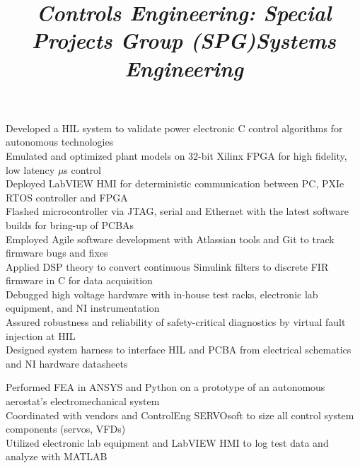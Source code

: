 \documentclass[mm]{res}
\newcommand{\tb}{\textbullet \xspace}
\begin{document}
\begin{resume}
\title{\textsl{Controls Engineering: Special Projects Group (SPG)}}
\begin{position}
\tb Developed a HIL system to validate power electronic C control algorithms for autonomous technologies\\
\tb Emulated and optimized plant models on 32-bit Xilinx FPGA for high fidelity, low latency $\mu$s control \\
\tb Deployed LabVIEW HMI for deterministic communication between PC, PXIe RTOS controller and FPGA \\
\tb Flashed microcontroller via JTAG, serial and Ethernet with the latest software builds for bring-up of PCBAs \\
\tb Employed Agile software development with Atlassian tools and Git to track firmware bugs and fixes \\
\tb Applied DSP theory to convert continuous Simulink filters to discrete FIR firmware in C for data acquisition\\
\tb Debugged high voltage hardware with in-house test racks, electronic lab equipment, and NI instrumentation \\
\tb Assured robustness and reliability of safety-critical diagnostics by virtual fault injection at HIL\\
\tb Designed system harness to interface HIL and PCBA from electrical schematics and NI hardware datasheets
\end{position}

\title{\textsl{Systems Engineering}}
\begin{position}
\tb Performed FEA in ANSYS and Python on a prototype of an autonomous aerostat's electromechanical system \\
\tb Coordinated with vendors and ControlEng SERVOsoft to size all control system components (servos, VFDs) \\
\tb Utilized electronic lab equipment and LabVIEW HMI to log test data and analyze with MATLAB
\end{position}


\end{resume}
\end{document}

